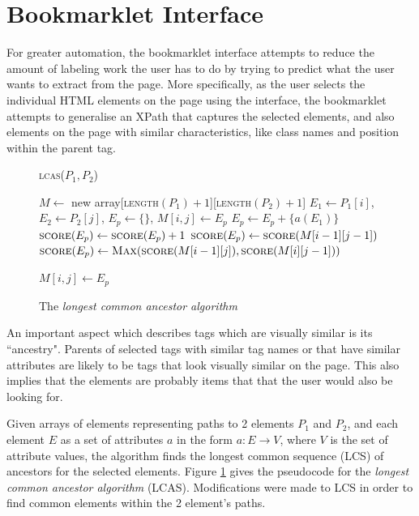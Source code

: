 \section{Bookmarklet Interface} \label{lcas}
For greater automation, the bookmarklet interface attempts to reduce the amount of labeling work the user has to do by trying to predict what the user wants to extract from the page. More specifically, as the user selects the individual HTML elements on the page using the interface, the bookmarklet attempts to generalise an XPath that captures the selected elements, and also elements on the page with similar characteristics, like class names and position within the parent tag.

\begin{figure}[htbp]
	\begin{algorithm}[H]
	\caption{\textsc{lcas($P_1,P_2$)}}
	\begin{algorithmic}[1]
		\STATE $M \leftarrow$ new array[\textsc{length}$(P_1) + 1$][\textsc{length}$(P_2) + 1$]
				\STATE $E_1 \leftarrow P_1[i]$, $E_2 \leftarrow P_2[j]$,  $E_p \leftarrow \{\}$, $M[i,j] \leftarrow E_p$
						\STATE $E_p \leftarrow E_p + \{a(E_1)\}$
						\STATE $\textsc{score}(E_p) \leftarrow \textsc{score}(E_p) + 1$			
					\ENDIF
				\ENDFOR
					\STATE $\textsc{score}(E_p) \leftarrow \textsc{score}(M[i-1][j-1])$
				\ELSE 
					\STATE $\textsc{score}(E_p) \leftarrow \textsc{Max}(\textsc{score}(M[i-1][j]),\textsc{score}(M[i][j-1]))$
					
				\ENDIF	
				\STATE $M[i,j] \leftarrow E_p$
			\ENDFOR	
		\ENDFOR
	\end{algorithmic}
	\end{algorithm}
\caption{The \textit{longest common ancestor algorithm}}
\label{fig:lcas}
\end{figure}

An important aspect which describes tags which are visually similar is its ``ancestry". Parents of selected tags with similar tag names or that have similar attributes are likely to be tags that look visually similar on the page. This also implies that the elements are probably items that that the user would also be looking for.




Given arrays of elements representing paths to 2 elements $P_1$ and $P_2$, and each element $E$ as a set of attributes $a$ in the form $a: E \to V$, where $V$ is the set of attribute values, the algorithm finds the longest common sequence (LCS) of ancestors for the selected elements. Figure \ref{fig:lcas} gives the pseudocode for the \textit{longest common ancestor algorithm} (LCAS). Modifications were made to LCS in order to find common elements within the 2 element's paths. 



